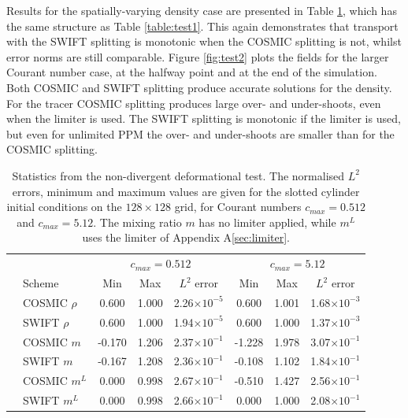 \documentclass{ametsocV6.1}
\begin{document}
Results for the spatially-varying density case are presented in Table \ref{table:test2}, which has the same structure as Table \ref{table:test1}. 
This again demonstrates that transport with the SWIFT splitting is monotonic when the COSMIC splitting is not, whilst error norms are still comparable.
Figure \ref{fig:test2} plots the fields for the larger Courant number case, at the halfway point and at the end of the simulation. Both COSMIC and SWIFT splitting produce accurate solutions for the density. For the tracer COSMIC splitting produces large over- and under-shoots, even when the limiter is used. The SWIFT splitting is monotonic if the limiter is used, but even for unlimited PPM the over- and under-shoots are smaller than for the COSMIC splitting. \\
\begin{table}[h!]
\small
\begin{center}
\begin{tabular}{| c | l | c c c | c c c |} \hline
  &  & \multicolumn{3}{c|}{$c_{max}=0.512$} & \multicolumn{3}{c|}{$c_{max}=5.12$} \\
  & Scheme &  Min & Max & $L^2$ error & Min & Max & $L^2$ error   \\ \hline
  \parbox[t]{2mm}{}
  & COSMIC $\rho$ & 0.600 & 1.000 & 2.26$\times 10^{-5}$ & 0.600 & 1.001 & 1.68$\times 10^{-3}$ \\
  & SWIFT $\rho$ & 0.600 & 1.000 & 1.94$\times 10^{-5}$ & 0.600 & 1.000 & 1.37$\times 10^{-3}$ \\
  & COSMIC $m$ & -0.170 & 1.206 & 2.37$\times 10^{-1}$ & -1.228 & 1.978 & 3.07$\times 10^{-1}$ \\
  & SWIFT $m$ & -0.167 & 1.208 & 2.36$\times 10^{-1}$ & -0.108 & 1.102 & 1.84$\times 10^{-1}$ \\
  & COSMIC $m^L$ & 0.000 & 0.998 & 2.67$\times 10^{-1}$ & -0.510 & 1.427 & 2.56$\times 10^{-1}$ \\
  & SWIFT $m^L$ & 0.000 & 0.998 & 2.66$\times 10^{-1}$ & 0.000 & 1.000 & 2.08$\times 10^{-1}$ \\ \hline
\end{tabular}
\caption{Statistics from the non-divergent deformational test. The normalised $L^2$ errors, minimum and maximum values are given for the slotted cylinder initial conditions on the $128\times128$ grid, for Courant numbers $c_{max}=0.512$ and $c_{max}=5.12$.
The mixing ratio $m$ has no limiter applied, while $m^L$ uses the limiter of Appendix A\ref{sec:limiter}.}
\label{table:test2}
\end{center}
\end{table}
\end{document}
